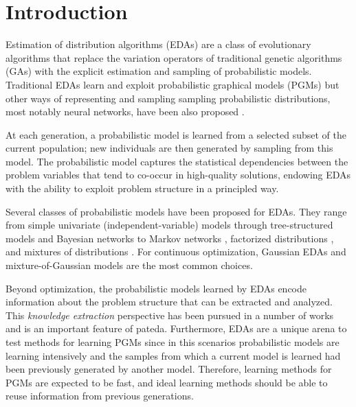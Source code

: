 \documentclass[a4paper,11pt]{article}
\begin{document}
\section{Introduction}

Estimation of distribution algorithms (EDAs)
\citep{Larranhaga_and_Lozano:2002,Lozano_et_al:2005,Muhlenbein_and_Paas:1996,Pelikan_et_al:2006} are a class of evolutionary algorithms that replace the variation operators of traditional genetic algorithms (GAs) \citep{Goldberg:1989,Holland:1975} with the explicit estimation and sampling of probabilistic models. Traditional EDAs learn and exploit probabilistic graphical models (PGMs) \cite{Koller_and_Friedman:2009, Larranhaga:2002a, Lauritzen:1996}  but other ways of representing and sampling sampling probabilistic distributions, most notably neural networks, have been also proposed \cite{Garciarena_et_al:2018a,Marti_et_al:2008}. 


At each generation, a probabilistic model is learned from a selected subset of the current population; new individuals are then generated by sampling from this model.  The probabilistic model captures the statistical dependencies between the problem variables that tend to co-occur in high-quality solutions, endowing EDAs with the ability to exploit problem structure in a principled way.

Several classes of probabilistic models have been proposed for EDAs.  They range from simple univariate (independent-variable) models \citep{Muhlenbein_and_Paas:1996,Baluja:1994} through tree-structured models \citep{Baluja_and_Davies:1997,Pelikan_and_Muhlenbein:1999} and Bayesian networks \citep{Etxeberria_and_Larranhaga:1999,Pelikan_et_al:1999,Pelikan:2005} to Markov networks
\citep{Santana:2003c,Santana:2005,Shakya_and_McCall:2007,Shakya_and_Santana:2008}, factorized distributions \citep{Muhlenbein_et_al:1999,Harik:1999,Ochoa_et_al:1999}, and mixtures of distributions \citep{Bosman_and_Thierens:2001d, Cho_and_Zhang:2002, Santana_et_al:2001b}.  For continuous optimization, Gaussian EDAs \citep{Larranhaga_et_al:1999,Larranhaga_et_al:2000,Bosman_and_Thierens:2000,Bosman_and_Thierens:2000a} and mixture-of-Gaussian models are the most common choices.

Beyond optimization, the probabilistic models learned by EDAs encode information about the problem structure that can be extracted and analyzed.  This \emph{knowledge extraction} perspective has been pursued in a number of works \citep{Echegoyen_et_al:2007,Echegoyen_et_al:2008,Hauschild_and_Pelikan:2008,Lima_et_al:2007,Santana_et_al:2007b} and is an important feature of pateda.  Furthermore, EDAs are a unique arena to test methods for learning PGMs since in this scenarios probabilistic models are learning intensively and the samples from which a current model is learned had been previously generated by another model. Therefore, learning methods for PGMs are expected to be fast, and ideal learning methods should be able to reuse information from previous generations.  
\end{document}

